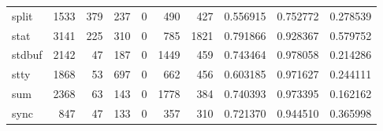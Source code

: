 \begin{tabular}{lrrrrrrrrr}
split     &                                1533 &                                             379 &                                            237 &                                             0 &                                            490 &                                          427 &                                           0.556915 &                               0.752772 &                             0.278539 \\
stat      &                                3141 &                                             225 &                                            310 &                                             0 &                                            785 &                                         1821 &                                           0.791866 &                               0.928367 &                             0.579752 \\
stdbuf    &                                2142 &                                              47 &                                            187 &                                             0 &                                           1449 &                                          459 &                                           0.743464 &                               0.978058 &                             0.214286 \\
stty      &                                1868 &                                              53 &                                            697 &                                             0 &                                            662 &                                          456 &                                           0.603185 &                               0.971627 &                             0.244111 \\
sum       &                                2368 &                                              63 &                                            143 &                                             0 &                                           1778 &                                          384 &                                           0.740393 &                               0.973395 &                             0.162162 \\
sync      &                                 847 &                                              47 &                                            133 &                                             0 &                                            357 &                                          310 &                                           0.721370 &                               0.944510 &                             0.365998 \\

\end{tabular}
